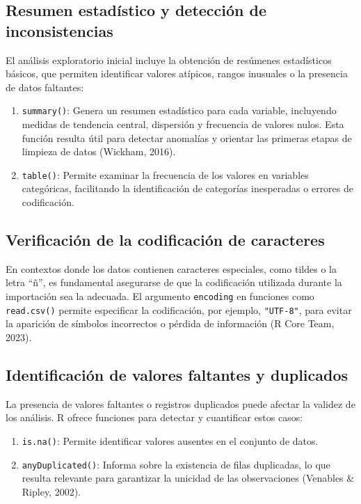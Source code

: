 \documentclass[
  spanish,
  a4paper,
  DIV=11,
  numbers=noendperiod,
  onepage,
  openany]{scrreprt}
\begin{document}
\subsection{Resumen estadístico y detección de
inconsistencias}\label{resumen-estaduxedstico-y-detecciuxf3n-de-inconsistencias}

El análisis exploratorio inicial incluye la obtención de resúmenes
estadísticos básicos, que permiten identificar valores atípicos, rangos
inusuales o la presencia de datos faltantes:

\begin{enumerate}
\def\labelenumi{\arabic{enumi}.}
\item
  \texttt{summary()}: Genera un resumen estadístico para cada variable,
  incluyendo medidas de tendencia central, dispersión y frecuencia de
  valores nulos. Esta función resulta útil para detectar anomalías y
  orientar las primeras etapas de limpieza de datos (Wickham, 2016).
\item
  \texttt{table()}: Permite examinar la frecuencia de los valores en
  variables categóricas, facilitando la identificación de categorías
  inesperadas o errores de codificación.
\end{enumerate}

\subsection{Verificación de la codificación de
caracteres}\label{verificaciuxf3n-de-la-codificaciuxf3n-de-caracteres}

En contextos donde los datos contienen caracteres especiales, como
tildes o la letra ``ñ'', es fundamental asegurarse de que la
codificación utilizada durante la importación sea la adecuada. El
argumento \texttt{encoding} en funciones como \texttt{read.csv()}
permite especificar la codificación, por ejemplo, \texttt{"UTF-8"}, para
evitar la aparición de símbolos incorrectos o pérdida de información (R
Core Team, 2023).

\subsection{Identificación de valores faltantes y
duplicados}\label{identificaciuxf3n-de-valores-faltantes-y-duplicados}

La presencia de valores faltantes o registros duplicados puede afectar
la validez de los análisis. R ofrece funciones para detectar y
cuantificar estos casos:

\begin{enumerate}
\def\labelenumi{\arabic{enumi}.}
\item
  \texttt{is.na()}: Permite identificar valores ausentes en el conjunto
  de datos.
\item
  \texttt{anyDuplicated()}: Informa sobre la existencia de filas
  duplicadas, lo que resulta relevante para garantizar la unicidad de
  las observaciones (Venables \& Ripley, 2002).
\end{enumerate}
\end{document}
